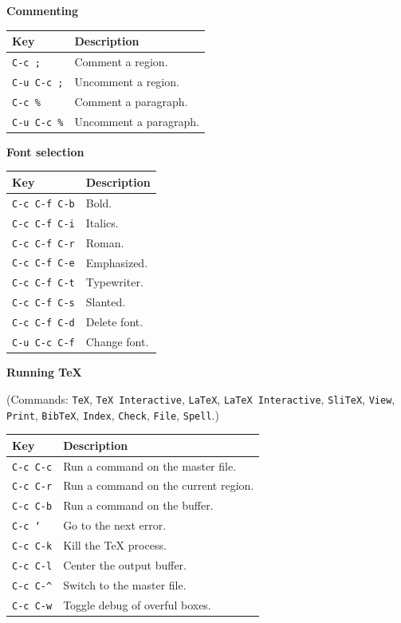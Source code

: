 \smallskip

\noindent
\textbf{Commenting}

\smallskip

\noindent
\begin{tabular}{p{\firstcol}p{\secondcol}}
\hline
\textbf{Key} & \textbf{Description}\\
\hline
\texttt{C-c ;}
& Comment a region.\\
\texttt{C-u C-c ;}
& Uncomment a region.\\
\texttt{C-c \%}
& Comment a paragraph.\\
\texttt{C-u C-c \%}
& Uncomment a paragraph.
\end{tabular}

\smallskip

\noindent
\textbf{Font selection}

\smallskip

\noindent
\begin{tabular}{p{\firstcol}p{\secondcol}}
\hline
\textbf{Key} & \textbf{Description}\\
\hline
\texttt{C-c C-f C-b}
& Bold.\\
\texttt{C-c C-f C-i}
& Italics.\\
\texttt{C-c C-f C-r}
& Roman.\\
\texttt{C-c C-f C-e}
& Emphasized.\\
\texttt{C-c C-f C-t}
& Typewriter.\\
\texttt{C-c C-f C-s}
& Slanted.\\
\texttt{C-c C-f C-d}
& Delete font.\\
\texttt{C-u C-c C-f}
& Change font.
\end{tabular}

\smallskip

\noindent
\textbf{Running \TeX{}}

\smallskip

\noindent
(Commands: \texttt{TeX}, \texttt{TeX Interactive}, \texttt{LaTeX},
\texttt{LaTeX Interactive}, \texttt{SliTeX}, \texttt{View},
\texttt{Print}, \texttt{BibTeX}, \texttt{Index}, \texttt{Check},
\texttt{File}, \texttt{Spell}.)

\smallskip

\noindent
\begin{tabular}{p{\firstcol}p{\secondcol}}
\hline
\textbf{Key} & \textbf{Description}\\
\hline
\texttt{C-c C-c}
& Run a command on the master file.\\
\texttt{C-c C-r}
& Run a command on the current region.\\
\texttt{C-c C-b}
& Run a command on the buffer.\\
\texttt{C-c `}
& Go to the next error.\\
\texttt{C-c C-k}
& Kill the \TeX{} process.\\
\texttt{C-c C-l}
& Center the output buffer.\\
\texttt{C-c C-\^{}}
& Switch to the master file.\\
\texttt{C-c C-w}
& Toggle debug of overful boxes.\\
\end{tabular}

